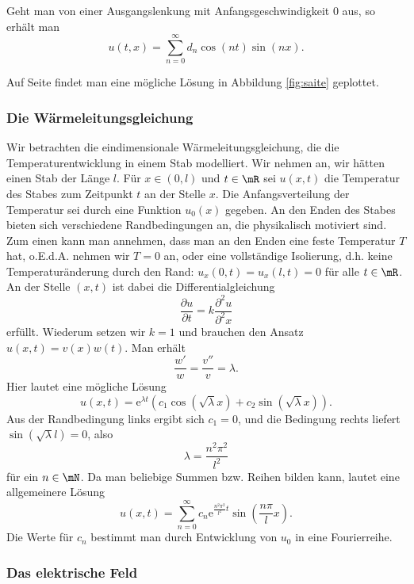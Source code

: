 \documentclass[%
draft,
11pt,%
twoside,%
titlepage,%
german,%
headsepline%
]{scrartcl}
\begin{document}
\begin{ueb}
Geht man von einer Ausgangslenkung mit Anfangsgeschwindigkeit $0$ aus, so erh\"alt man
$$u(t,x)=\sum_{n=0}^\infty d_n\cos(nt)\sin(nx).$$
\end{ueb}

Auf Seite \pageref{fig:saite} findet man eine mögliche Lösung in Abbildung \ref{fig:saite} geplottet.

\subsubsection{Die W\"armeleitungsgleichung}

Wir betrachten die eindimensionale W\"arme\-lei\-tungs\-gleichung, die die Temperaturentwicklung in einem Stab modelliert. Wir nehmen an, wir h\"atten einen Stab der L\"ange $l$. F\"ur $x\in(0,l)$ und $t\in\mR$ sei $u(x,t)$ die Temperatur des Stabes zum Zeitpunkt $t$ an der Stelle $x$. Die Anfangsverteilung der Temperatur sei durch eine Funktion $u_0(x)$ gegeben. An den Enden des Stabes bieten sich verschiedene Randbedingungen an, die physikalisch motiviert sind. Zum einen kann man annehmen, dass man an den Enden eine feste Temperatur $T$ hat, o.E.d.A. nehmen wir $T=0$
an, oder eine vollst\"andige Isolierung, d.h. keine Temperatur\"anderung durch den Rand: $u_x(0,t)=u_x(l,t)=0$ f\"ur alle $t\in\mR$. An der
Stelle $(x,t)$ ist dabei die Differentialgleichung
$$\frac{\partial u}{\partial t}=k\frac{\partial^2 u}{\partial^2 x}$$
erf\"ullt. Wiederum setzen wir $k=1$ und brauchen den Ansatz $u(x,t)=v(x)w(t)$. Man erh\"alt
$$\frac{w'}{w}=\frac{v''}{v}=\lambda.$$
Hier lautet eine m\"ogliche L\"osung
$$u(x,t)=\mathrm{e}^{\lambda t}(c_1\cos(\sqrt{\lambda}x)+c_2\sin(\sqrt{\lambda}x)).$$
Aus der Randbedingung links ergibt sich $c_1=0$, und die Bedingung rechts liefert $\sin(\sqrt{\lambda}l)=0$, also
$$\lambda=\frac{n^2\pi^2}{l^2}$$
f\"ur ein $n\in\mN$. Da man beliebige Summen bzw. Reihen bilden kann, lautet eine allgemeinere L\"osung
$$u(x,t)=\sum_{n=0}^\infty c_n\mathrm{e}^{\frac{n^2\pi^2}{l^2}t}\sin\left(\frac{n\pi}{l}x\right).$$
Die Werte f\"ur $c_n$ bestimmt man durch Entwicklung von $u_0$ in eine Fourierreihe.

\subsubsection{Das elektrische Feld}
\end{document}
